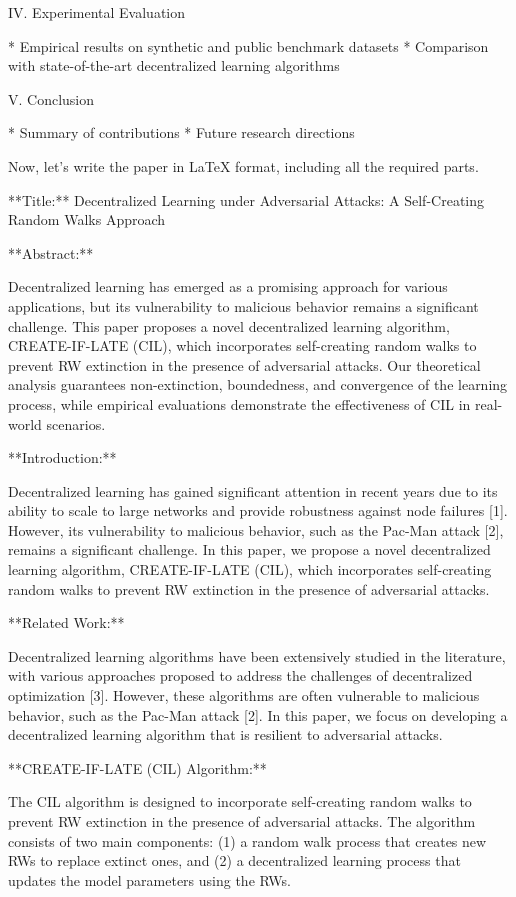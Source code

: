 IV. Experimental Evaluation

* Empirical results on synthetic and public benchmark datasets
* Comparison with state-of-the-art decentralized learning algorithms

V. Conclusion

* Summary of contributions
* Future research directions

Now, let's write the paper in LaTeX format, including all the required parts.

**Title:** Decentralized Learning under Adversarial Attacks: A Self-Creating Random Walks Approach

**Abstract:**

Decentralized learning has emerged as a promising approach for various applications, but its vulnerability to malicious behavior remains a significant challenge. This paper proposes a novel decentralized learning algorithm, CREATE-IF-LATE (CIL), which incorporates self-creating random walks to prevent RW extinction in the presence of adversarial attacks. Our theoretical analysis guarantees non-extinction, boundedness, and convergence of the learning process, while empirical evaluations demonstrate the effectiveness of CIL in real-world scenarios.

**Introduction:**

Decentralized learning has gained significant attention in recent years due to its ability to scale to large networks and provide robustness against node failures [1]. However, its vulnerability to malicious behavior, such as the Pac-Man attack [2], remains a significant challenge. In this paper, we propose a novel decentralized learning algorithm, CREATE-IF-LATE (CIL), which incorporates self-creating random walks to prevent RW extinction in the presence of adversarial attacks.

**Related Work:**

Decentralized learning algorithms have been extensively studied in the literature, with various approaches proposed to address the challenges of decentralized optimization [3]. However, these algorithms are often vulnerable to malicious behavior, such as the Pac-Man attack [2]. In this paper, we focus on developing a decentralized learning algorithm that is resilient to adversarial attacks.

**CREATE-IF-LATE (CIL) Algorithm:**

The CIL algorithm is designed to incorporate self-creating random walks to prevent RW extinction in the presence of adversarial attacks. The algorithm consists of two main components: (1) a random walk process that creates new RWs to replace extinct ones, and (2) a decentralized learning process that updates the model parameters using the RWs.

